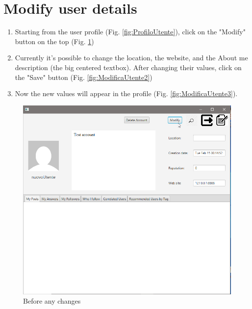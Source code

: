 \documentclass[11pt]{report}
\begin{document}
\section{Modify user details}
\begin{enumerate}
    \item Starting from the user profile (Fig. \ref{fig:ProfiloUtente}), click on the "Modify" button on the top (Fig. \ref{fig:ModificaUtente1})
    \item Currently it's possible to change the location, the website, and the About me description (the big centered textbox). After changing their values, click on the "Save" button (Fig. \ref{fig:ModificaUtente2})
    \item Now the new values will appear in the profile (Fig. \ref{fig:ModificaUtente3}).
\end{enumerate}
\begin{figure}[H]
  \centering
  \includegraphics[width=\textwidth,keepaspectratio=true]{img/user_manual/ModificaUtente1.png}
  \caption{Before any changes}
  \label{fig:ModificaUtente1}
\end{figure}
\end{document}
